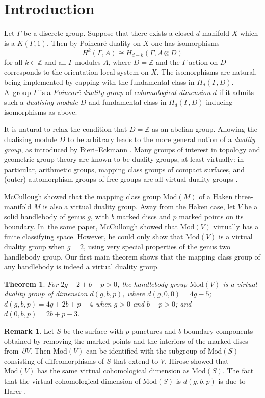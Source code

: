 \documentclass[11pt]{article}
\theoremstyle{plain}
\newtheorem{thmA}{Theorem}
\theoremstyle{definition}
\newtheorem{rem}[thm]{Remark}
\newcommand{\Z}{\mathbb Z}
\newcommand{\mcg}{\mathrm{Mod}}
\newcommand{\hmod}{\mathrm{Mod}}
\begin{document}
\section{Introduction}
Let $\Gamma$ be a discrete group. Suppose that there exists a closed $d$-manifold $X$ which is a $K(\Gamma,1)$. Then by Poincaré duality on $X$ one has isomorphisms
\[
H^k(\Gamma,A) \cong H_{d-k}(\Gamma, A\otimes D)
\]
for all $k \in \Z$ and all $\Gamma$-modules $A$, where $D=\mathbb{Z}$ and the $\Gamma$-action on $D$ corresponds to the orientation local system on $X$. The isomorphisms are natural, being implemented by capping with the fundamental class in $H_d(\Gamma,D)$. A~group $\Gamma$ is a \emph{Poincaré duality group} of \emph{cohomological dimension} $d$ if it admits such a \emph{dualising module} $D$ and fundamental class in $H_d(\Gamma,D)$ inducing isomorphisms as above.

It is natural to relax the condition that $D=\mathbb{Z}$ as an abelian group. Allowing the dualising module $D$ to be arbitrary leads to the more general notion of a \emph{duality group}, as introduced by Bieri--Eckmann \cite{be}. Many groups of interest in topology and geometric group theory are known to be duality groups, at least virtually: in particular, arithmetic groups, mapping class groups of compact surfaces, and (outer) automorphism groups of free groups are all virtual duality groups \cite{borelserre,harer,bestvinafeighn}.

McCullough \cite{mccullough} showed that the mapping class group $\mcg(M)$ of a Haken three-manifold $M$ is also a virtual duality group. Away from the Haken case, let $V$ be a solid handlebody of genus $g$, with $b$ marked discs and $p$ marked points on its boundary. In~the same paper, McCullough showed that $\mcg(V)$ virtually has a finite classifying space. However, he could only show that $\mcg(V)$ is a virtual duality group when $g=2$, using very special properties of the genus two handlebody group. Our first main theorem shows that the mapping class group of any handlebody is indeed a virtual duality group.

\begin{thmA}\label{thm:A}
For $2g -2+ b +p > 0$, the handlebody group $\hmod(V)$ is a virtual duality
group of dimension $d(g, b, p)$, where $d(g, 0 , 0 ) = 4 g - 5 $; $d(g , b , p ) = 4 g + 2 b + p - 4$ when $g > 0$ and $b + p > 0$; and $d(0,b,p)=2b + p - 3$.
\end{thmA}

\begin{rem} Let $S$ be the surface with $p$ punctures and $b$ boundary components obtained by removing the marked points and the interiors of the marked discs from~$\partial V$. Then $\mcg(V)$ can be identified with the subgroup of $\mcg(S)$ consisting of diffeomorphisms of $S$ that extend to $V$. Hirose \cite{hirose} showed that $\mcg(V)$ has the same virtual cohomological dimension as $\mcg(S)$. The fact that the virtual cohomological dimension of $\mcg(S)$ is $d(g,b,p)$ is due to Harer \cite{harer}.
\end{rem}
\end{document}
